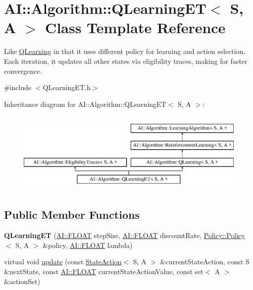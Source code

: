 \hypertarget{classAI_1_1Algorithm_1_1QLearningET}{\section{A\-I\-:\-:Algorithm\-:\-:Q\-Learning\-E\-T$<$ S, A $>$ Class Template Reference}
\label{classAI_1_1Algorithm_1_1QLearningET}
}


Like \hyperlink{classAI_1_1Algorithm_1_1QLearning}{Q\-Learning} in that it uses different policy for learning and action selection. Each iteration, it updates all other states via eligibility traces, making for faster convergence.  




{\ttfamily \#include $<$Q\-Learning\-E\-T.\-h$>$}

Inheritance diagram for A\-I\-:\-:Algorithm\-:\-:Q\-Learning\-E\-T$<$ S, A $>$\-:\begin{figure}[H]
\begin{center}
\leavevmode
\includegraphics[height=4.000000cm]{classAI_1_1Algorithm_1_1QLearningET}
\end{center}
\end{figure}
\subsection*{Public Member Functions}
\begin{DoxyCompactItemize}
\item 
\hypertarget{classAI_1_1Algorithm_1_1QLearningET_ae1c5b2ba1a680bb8bd2cfaa64dc41e91}{{\bfseries Q\-Learning\-E\-T} (\hyperlink{namespaceAI_a41b74884a20833db653dded3918e05c3}{A\-I\-::\-F\-L\-O\-A\-T} step\-Size, \hyperlink{namespaceAI_a41b74884a20833db653dded3918e05c3}{A\-I\-::\-F\-L\-O\-A\-T} discount\-Rate, \hyperlink{classAI_1_1Algorithm_1_1Policy_1_1Policy}{Policy\-::\-Policy}$<$ S, A $>$ \&policy, \hyperlink{namespaceAI_a41b74884a20833db653dded3918e05c3}{A\-I\-::\-F\-L\-O\-A\-T} lambda)}\label{classAI_1_1Algorithm_1_1QLearningET_ae1c5b2ba1a680bb8bd2cfaa64dc41e91}

\item 
virtual void \hyperlink{classAI_1_1Algorithm_1_1QLearningET_a9a245dcb3ca8f26b37e5a6daa6d4a898}{update} (const \hyperlink{classAI_1_1StateAction}{State\-Action}$<$ S, A $>$ \&current\-State\-Action, const S \&next\-State, const \hyperlink{namespaceAI_a41b74884a20833db653dded3918e05c3}{A\-I\-::\-F\-L\-O\-A\-T} current\-State\-Action\-Value, const set$<$ A $>$ \&action\-Set)
\end{DoxyCompactItemize}
